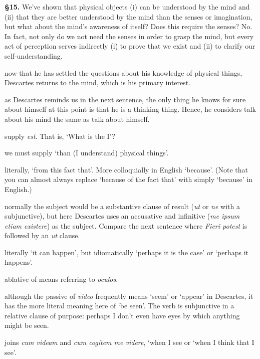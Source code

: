 \prenotes

\textbf{§15.} We've shown that physical objects (i) can be understood by the mind and (ii) that they are better understood by the mind than the senses or imagination, but what about the mind's awareness of itself? Does this require the senses? No. In fact, not only do we not need the senses in order to grasp the mind, but every act of perception serves indirectly (i) to prove that we exist and (ii) to clarify our self-understanding.

 now that he has settled the questions about his knowledge of physical things, Descartes returns to the mind, which is his primary interest.

 as Descartes reminds us in the next sentence, the only thing he knows for sure about himself at this point is that he is a thinking thing. Hence, he considers talk about his mind the same as talk about himself.

 supply \textit{est}. That is, `What is the I'?

 we must supply `than (I understand) physical things'.

 literally, `from this fact that'. More colloquially in English `because'. (Note that you can almost always replace `because of the fact that' with simply `because' in English.)

 normally the subject would be a substantive clause of result (\textit{ut} or \textit{ne} with a subjunctive), but here Descartes uses an accusative and infinitive (\textit{me ipsum etiam existere}) as the subject. Compare the next sentence where \textit{Fieri potest} is followed by an \textit{ut} clause.

 literally `it can happen', but idiomatically `perhaps it is the case' or `perhaps it happens'.

 ablative of means referring to \textit{oculos}.

 although the passive of \textit{video} frequently means `seem' or `appear' in Descartes, it has the more literal meaning here of `be seen'. The verb is subjunctive in a relative clause of purpose: perhaps I don't even have eyes by which anything might be seen.

 joins \textit{cum videam} and \textit{cum cogitem me videre}, `when I see or `when I think that I see'.

